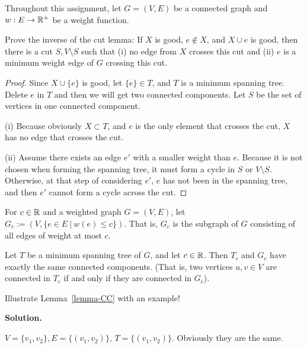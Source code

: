 


Throughout this assignment, let $G = (V,E)$ be a connected graph
and $w: E \rightarrow \mathbb{R}^+$ be a weight function.\\

\begin{exercise}
    Prove the inverse of the cut lemma:
      If $X$ is good, $e \not \in X$, and $X \cup e$ is good,
      then there is a cut $S, V\setminus S$ such that (i) no
      edge from $X$ crosses this cut and (ii) $e$ is a minimum
      weight edge of $G$ crossing this cut.
\end{exercise}
\begin{proof}
    Since $X \cup \{e\}$ is good, let $\{e\}\in T$, and $T$ is a minimum spanning tree. Delete $e$ in $T$ and then we will get two connected components. Let $S$ be the set of vertices in one connected component.

    (i) Because obviously $X\subset T$, and $e$ is the only element that crosses the cut, $X$ has no edge that crosses the cut.

    (ii) Assume there exists an edge $e'$ with a smaller weight than $e$. Because it is not chosen when forming the spanning tree, it must form a cycle in $S$ or $V\setminus S$. Otherwise, at that step of considering $e'$, $e$ has not been in the spanning tree, and then $e'$ cannot form a cycle across the cut.
\end{proof}

\begin{definition}
  For $c \in \mathbb{R}$ and a weighted graph $G = (V,E)$, let
  $G_c := (V, \{e \in E \ | \ w(e) \leq c\})$. That is, $G_c$ is the
  subgraph of $G$ consisting of all edges of weight at most $c$.
\end{definition}

\begin{lemma}
  Let $T$ be a minimum spanning tree of $G$, and let $c \in \mathbb{R}$.  Then
  $T_c$ and $G_c$ have exactly the same connected components.  (That
  is, two vertices $u,v \in V$ are connected in $T_c$ if and only if
  they are connected in $G_c$).
  \label{lemma-CC}
\end{lemma}

\begin{exercise}
     Illustrate Lemma~\ref{lemma-CC} with an example!
\end{exercise}

\textbf{Solution.}
\par 
$V=\{v_1,v_2\},E=\{(v_1,v_2)\}$, $T=\{(v_1,v_2)\}$. Obviously they are the same.

